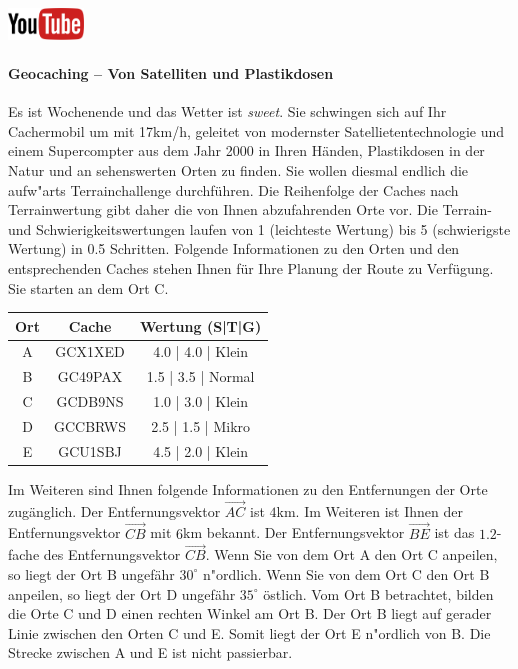 \documentclass[a4paper, 10pt]{scrartcl}\usepackage[]{graphicx}\usepackage[]{xcolor}
\begin{document}
\hfill\href{https://youtu.be/3LAq3R0rS14}{\includegraphics[width =
  2cm]{img/youtube}} %
\hspace{2Ex}

\paragraph{Geocaching -- Von Satelliten und Plastikdosen}



Es ist Wochenende und das Wetter ist \textit{sweet}. Sie schwingen sich auf
Ihr Cachermobil um mit 17km/h, geleitet von modernster
Satellietentechnologie und einem Supercompter aus dem Jahr 2000 in Ihren
H{\"a}nden, Plastikdosen in der Natur und an sehenswerten Orten zu finden. Sie
wollen diesmal endlich die aufw{"a}rts Terrainchallenge
durchf{\"u}hren. Die Reihenfolge der Caches nach Terrainwertung gibt daher
die von Ihnen abzufahrenden Orte vor. Die Terrain- und
Schwierigkeitswertungen laufen von 1 (leichteste Wertung) bis 5
(schwierigste Wertung) in 0.5 Schritten. Folgende Informationen zu den
Orten und den entsprechenden Caches stehen Ihnen f{\"u}r Ihre Planung der Route
zu Verf{\"u}gung. Sie starten an dem Ort C.

\begin{center}
  \begin{tabular}{ ccc }
    \toprule
    Ort & Cache & Wertung (S|T|G) \\
    \midrule
    A & GCX1XED & 4.0 | 4.0 | Klein \\
    B & GC49PAX & 1.5 | 3.5 | Normal \\ 
    C & GCDB9NS & 1.0 | 3.0 | Klein \\ 
    D & GCCBRWS & 2.5 | 1.5 | Mikro \\ 
    E & GCU1SBJ & 4.5 | 2.0 | Klein \\     
 \bottomrule
\end{tabular}
\end{center}

Im Weiteren sind Ihnen folgende Informationen zu den Entfernungen der Orte
zug{\"a}nglich. Der Entfernungsvektor $\overrightarrow{AC}$ ist
$4$km. Im Weiteren ist Ihnen der Entfernungsvektor
$\overrightarrow{CB}$ mit $6$km bekannt. Der
Entfernungsvektor $\overrightarrow{BE}$ ist das $1.2$-fache
des Entfernungsvektor $\overrightarrow{CB}$. Wenn Sie von dem Ort A den Ort
C anpeilen, so liegt der Ort B ungef{\"a}hr $30^\circ$
n{"o}rdlich. Wenn Sie von dem Ort C den Ort
B anpeilen, so liegt der Ort D ungef{\"a}hr $35^\circ$
{\"o}stlich. Vom Ort B betrachtet, bilden die Orte C und D einen
rechten Winkel am Ort B. Der Ort B liegt auf gerader Linie zwischen den
Orten C und E. Somit liegt der Ort E n{"o}rdlich von B. Die Strecke
zwischen A und E ist nicht passierbar.\\
\end{document}
